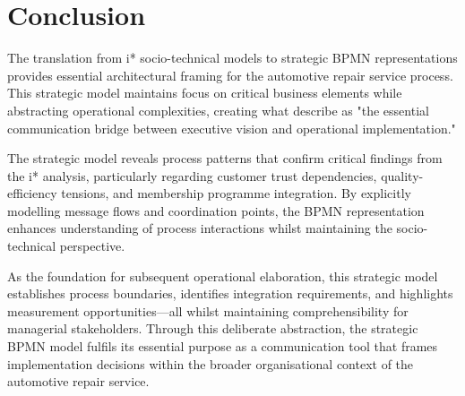 \documentclass[14pt,a4paper]{article}
\begin{document}
\section{Conclusion}

The translation from i* socio-technical models to strategic BPMN representations provides essential architectural framing for the automotive repair service process. This strategic model maintains focus on critical business elements while abstracting operational complexities, creating what \textit{\parencite[p. 103]{Bosch2018}} describe as "the essential communication bridge between executive vision and operational implementation."

The strategic model reveals process patterns that confirm critical findings from the i* analysis, particularly regarding customer trust dependencies, quality-efficiency tensions, and membership programme integration. By explicitly modelling message flows and coordination points, the BPMN representation enhances understanding of process interactions whilst maintaining the socio-technical perspective.

As the foundation for subsequent operational elaboration, this strategic model establishes process boundaries, identifies integration requirements, and highlights measurement opportunities—all whilst maintaining comprehensibility for managerial stakeholders. Through this deliberate abstraction, the strategic BPMN model fulfils its essential purpose as a communication tool that frames implementation decisions within the broader organisational context of the automotive repair service.

\newpage

\printbibliography
\end{document}
